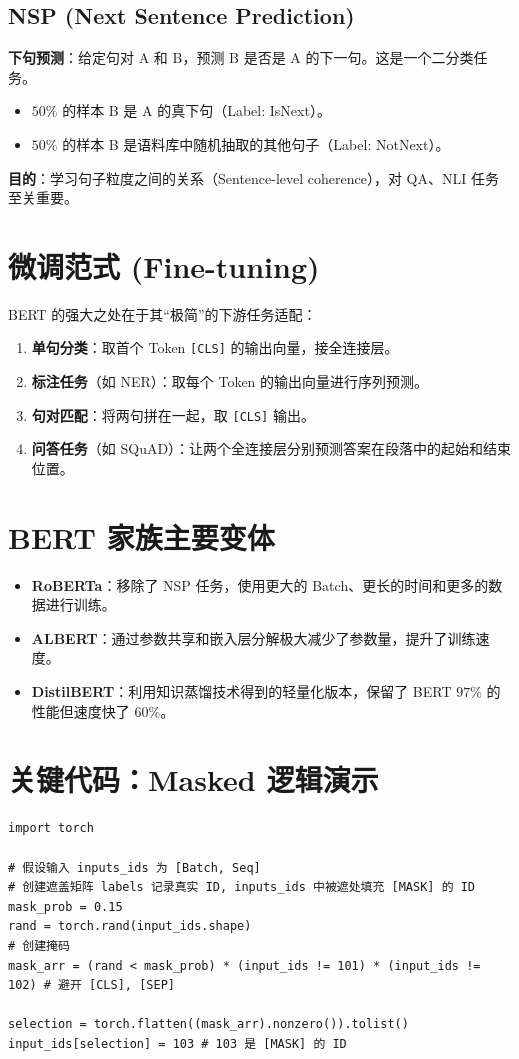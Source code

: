 \documentclass[12pt, a4paper]{article}
\begin{document}
\subsection{NSP (Next Sentence Prediction)}
\textbf{下句预测}：给定句对 A 和 B，预测 B 是否是 A 的下一句。这是一个二分类任务。
\begin{itemize}
    \item $50\%$ 的样本 B 是 A 的真下句（Label: IsNext）。
    \item $50\%$ 的样本 B 是语料库中随机抽取的其他句子（Label: NotNext）。
\end{itemize}
\textbf{目的}：学习句子粒度之间的关系（Sentence-level coherence），对 QA、NLI 任务至关重要。

\section{微调范式 (Fine-tuning)}
BERT 的强大之处在于其“极简”的下游任务适配：
\begin{enumerate}
    \item \textbf{单句分类}：取首个 Token \texttt{[CLS]} 的输出向量，接全连接层。
    \item \textbf{标注任务}（如 NER）：取每个 Token 的输出向量进行序列预测。
    \item \textbf{句对匹配}：将两句拼在一起，取 \texttt{[CLS]} 输出。
    \item \textbf{问答任务}（如 SQuAD）：让两个全连接层分别预测答案在段落中的起始和结束位置。
\end{enumerate}

\section{BERT 家族主要变体}
\begin{itemize}
    \item \textbf{RoBERTa}：移除了 NSP 任务，使用更大的 Batch、更长的时间和更多的数据进行训练。
    \item \textbf{ALBERT}：通过参数共享和嵌入层分解极大减少了参数量，提升了训练速度。
    \item \textbf{DistilBERT}：利用知识蒸馏技术得到的轻量化版本，保留了 BERT $97\%$ 的性能但速度快了 $60\%$。
\end{itemize}

\section{关键代码：Masked 逻辑演示}
\begin{lstlisting}
import torch

# 假设输入 inputs_ids 为 [Batch, Seq]
# 创建遮盖矩阵 labels 记录真实 ID, inputs_ids 中被遮处填充 [MASK] 的 ID
mask_prob = 0.15
rand = torch.rand(input_ids.shape)
# 创建掩码
mask_arr = (rand < mask_prob) * (input_ids != 101) * (input_ids != 102) # 避开 [CLS], [SEP]

selection = torch.flatten((mask_arr).nonzero()).tolist()
input_ids[selection] = 103 # 103 是 [MASK] 的 ID
\end{lstlisting}
\end{document}
